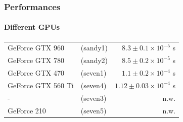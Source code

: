 \begin{frame}
\frametitle{Performances}
\framesubtitle{Different GPUs}
\begin{center}
\begin{tabular}{l l r}
GeForce GTX 960		&	(sandy1)	&	$8.3\pm0.1\times10^{-5}$ s\\
GeForce GTX 780		&	(sandy2)	&	$8.5\pm0.2\times10^{-5}$ s\\
GeForce GTX 470		&	(seven1)	&	$1.1\pm0.2\times10^{-4}$ s\\
GeForce GTX 560 Ti	&	(seven4)	&	$1.12\pm0.03\times10^{-4}$ s\\
-	&	(seven3)	&	n.w.\\
GeForce 210			&	(seven5)	&	n.w.\\
\end{tabular}
\end{center}
\end{frame}
